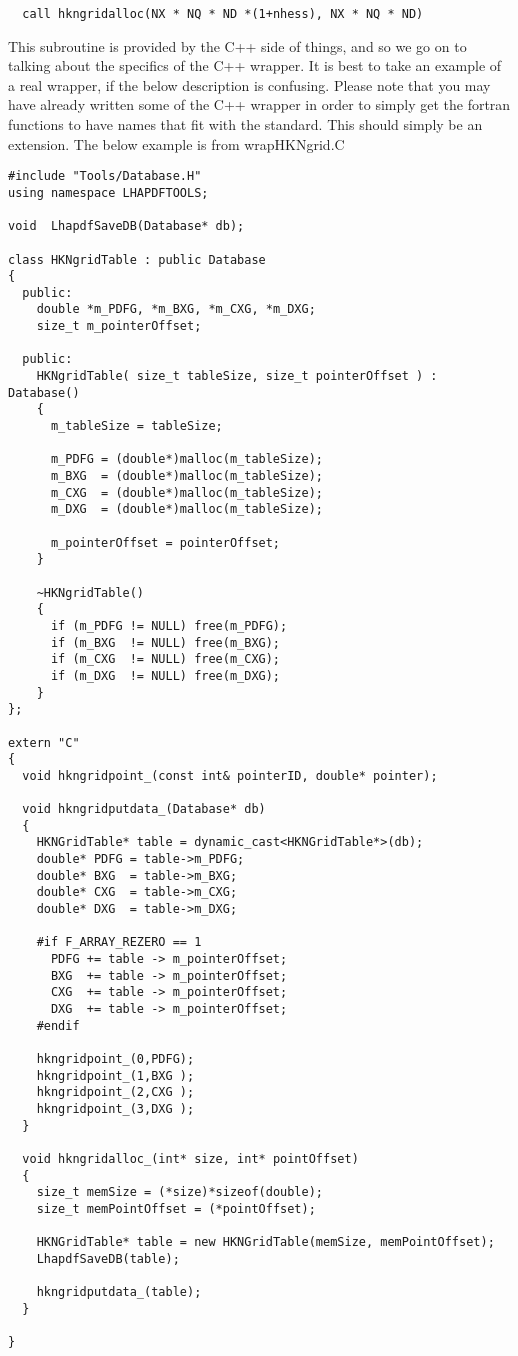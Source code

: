 \begin{verbatim}
  call hkngridalloc(NX * NQ * ND *(1+nhess), NX * NQ * ND)
\end{verbatim}

This subroutine is provided by the C++ side of things, and so we go on to
talking about the specifics of the C++ wrapper. It is best to take an 
example of a real wrapper, if the below description is confusing. Please
note that you may have already written some of the C++ wrapper in order to
simply get the fortran functions to have names that fit with the standard.
This should simply be an extension. The below example is from wrapHKNgrid.C

\begin{verbatim}
#include "Tools/Database.H"
using namespace LHAPDFTOOLS;

void  LhapdfSaveDB(Database* db);

class HKNgridTable : public Database 
{
  public: 
    double *m_PDFG, *m_BXG, *m_CXG, *m_DXG;
    size_t m_pointerOffset;

  public:
    HKNgridTable( size_t tableSize, size_t pointerOffset ) : Database()
    {
      m_tableSize = tableSize;

      m_PDFG = (double*)malloc(m_tableSize);
      m_BXG  = (double*)malloc(m_tableSize);
      m_CXG  = (double*)malloc(m_tableSize);
      m_DXG  = (double*)malloc(m_tableSize);

      m_pointerOffset = pointerOffset;
    }

    ~HKNgridTable()
    {
      if (m_PDFG != NULL) free(m_PDFG);
      if (m_BXG  != NULL) free(m_BXG);
      if (m_CXG  != NULL) free(m_CXG);
      if (m_DXG  != NULL) free(m_DXG);
    }
};

extern "C" 
{
  void hkngridpoint_(const int& pointerID, double* pointer);

  void hkngridputdata_(Database* db)
  {
    HKNGridTable* table = dynamic_cast<HKNGridTable*>(db);
    double* PDFG = table->m_PDFG;
    double* BXG  = table->m_BXG;
    double* CXG  = table->m_CXG;
    double* DXG  = table->m_DXG;

    #if F_ARRAY_REZERO == 1
      PDFG += table -> m_pointerOffset;
      BXG  += table -> m_pointerOffset;
      CXG  += table -> m_pointerOffset;
      DXG  += table -> m_pointerOffset;
    #endif
    
    hkngridpoint_(0,PDFG);
    hkngridpoint_(1,BXG );
    hkngridpoint_(2,CXG );
    hkngridpoint_(3,DXG );
  }

  void hkngridalloc_(int* size, int* pointOffset)
  {
    size_t memSize = (*size)*sizeof(double);
    size_t memPointOffset = (*pointOffset);

    HKNGridTable* table = new HKNGridTable(memSize, memPointOffset);
    LhapdfSaveDB(table);

    hkngridputdata_(table);
  }

}
\end{verbatim}

